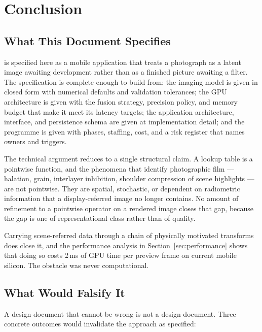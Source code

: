 \section{Conclusion}

\subsection{What This Document Specifies}

\EM{} is specified here as a mobile application that treats a photograph as a
latent image awaiting development rather than as a finished picture awaiting a
filter. The specification is complete enough to build from: the imaging model is
given in closed form with numerical defaults and validation tolerances; the GPU
architecture is given with the fusion strategy, precision policy, and memory
budget that make it meet its latency targets; the application architecture,
interface, and persistence schema are given at implementation detail; and the
programme is given with phases, staffing, cost, and a risk register that names
owners and triggers.

The technical argument reduces to a single structural claim. A lookup table is a
pointwise function, and the phenomena that identify photographic film ---
halation, grain, interlayer inhibition, shoulder compression of scene highlights
--- are not pointwise. They are spatial, stochastic, or dependent on radiometric
information that a display-referred image no longer contains. No amount of
refinement to a pointwise operator on a rendered image closes that gap, because
the gap is one of representational class rather than of quality.

Carrying scene-referred data through a chain of physically motivated transforms
does close it, and the performance analysis in
Section~\ref{sec:performance} shows that doing so costs 2\,ms of GPU time per
preview frame on current mobile silicon. The obstacle was never computational.

\subsection{What Would Falsify It}

A design document that cannot be wrong is not a design document. Three concrete
outcomes would invalidate the approach as specified:

